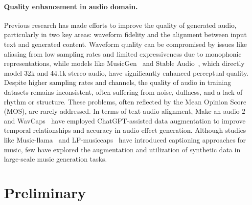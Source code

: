 \paragraph{Quality enhancement in audio domain.}
Previous research has made efforts to improve the quality of generated audio, particularly in two key areas: waveform fidelity and the alignment between input text and generated content. Waveform quality can be compromised by issues like aliasing from low sampling rates and limited expressiveness due to monophonic representations, while models like MusicGen~\citep{copet2024simple} and Stable Audio~\citep{evans2024fast, 123evans2024long}, which directly model 32k and 44.1k stereo audio, have significantly enhanced perceptual quality. Despite higher sampling rates and channels, the quality of audio in training datasets remains inconsistent, often suffering from noise, dullness, and a lack of rhythm or structure. These problems, often reflected by the Mean Opinion Score (MOS), are rarely addressed. In terms of text-audio alignment, Make-an-audio 2~\citep{huang2023make} and WavCaps~\citep{mei2024wavcaps} have employed ChatGPT-assisted data augmentation to improve temporal relationships and accuracy in audio effect generation. Although studies like Music-llama~\citep{liu2024music} and LP-musiccaps~\citep{doh2023lp} have introduced captioning approaches for music, few have explored the augmentation and utilization of synthetic data in large-scale music generation tasks.

\section{Preliminary}\label{sec:rel}

